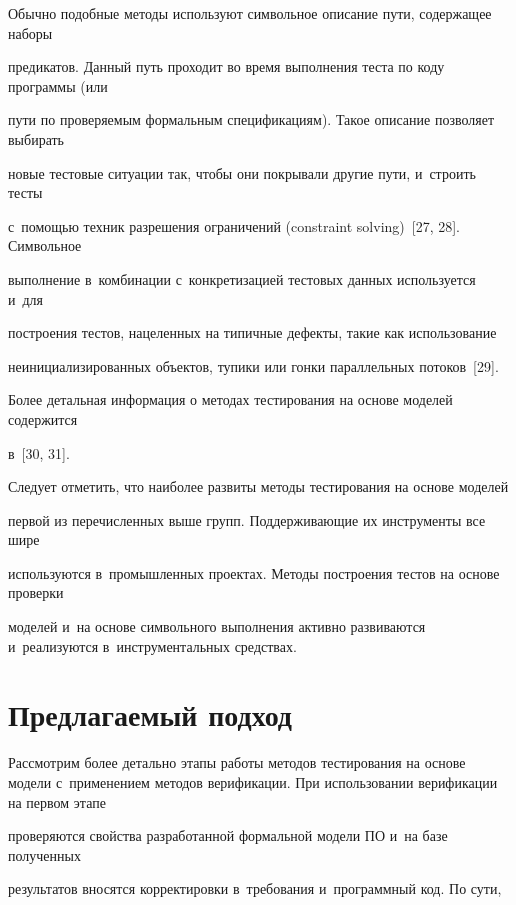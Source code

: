    Обычно подобные методы используют символьное описание пути, содержащее наборы


предикатов. Данный путь проходит во время выполнения теста по коду программы (или


пути по проверяемым формальным спецификациям). Такое описание позволяет выбирать


новые тестовые ситуации так, чтобы они покрывали другие пути, и~строить тесты


с~помощью техник разрешения ограничений (constraint solving)~[27, 28]. Символьное


выполнение в~комбинации с~конкретизацией тестовых данных используется и~для


построения тестов, нацеленных на типичные дефекты, такие как использование


неинициализированных объектов, тупики или гонки параллельных потоков~[29].





   Более детальная информация о методах тестирования на основе моделей содержится


в~[30, 31].





   Следует отметить, что наиболее развиты методы тестирования на основе моделей


первой из перечисленных выше групп. Поддерживающие их инструменты все шире


используются в~промышленных проектах. Методы построения тес\-тов на основе проверки


моделей и~на основе символьного выполнения активно развиваются и~реализуются в~инструментальных средствах.





\section{Предлагаемый подход}





   Рассмотрим более детально этапы работы методов тестирования на основе модели с~применением методов верификации. При использовании верификации на первом этапе


проверяются свойства разработанной формальной модели ПО и~на базе полученных


результатов вносятся корректировки в~требования и~программный код. По сути,


